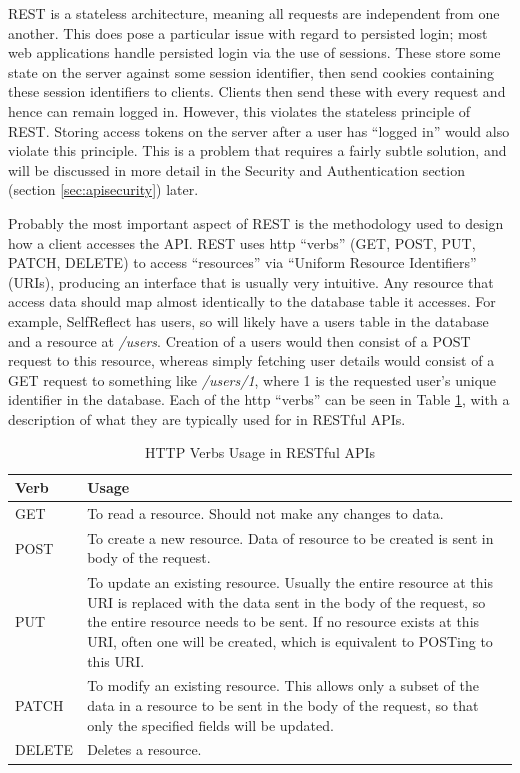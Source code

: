 \documentclass[11pt,openright,a4paper]{report}
\begin{document}
REST is a stateless architecture, meaning all requests are independent from one another. This does pose a particular issue with regard to persisted login; most web applications handle persisted login via the use of sessions. These store some state on the server against some session identifier, then send cookies containing these session identifiers to clients. Clients then send these with every request and hence can remain logged in. However, this violates the stateless principle of REST. Storing access tokens on the server after a user has \enquote{logged in} would also violate this principle. This is a problem that requires a fairly subtle solution, and will be discussed in more detail in the Security and Authentication section (section \ref{sec:apisecurity}) later.

Probably the most important aspect of REST is the methodology used to design how a client accesses the API. REST uses http \enquote{verbs} (GET, POST, PUT, PATCH, DELETE) \parencite{httpmethods} to access \enquote{resources} via \enquote{Uniform Resource Identifiers} (URIs), producing an interface that is usually very intuitive. Any resource that access data should map almost identically to the database table it accesses. For example, SelfReflect has users, so will likely have a users table in the database and a resource at \emph{/users}. Creation of a users would then consist of a POST request to this resource, whereas simply fetching user details would consist of a GET request to something like \emph{/users/1}, where 1 is the requested user's unique identifier in the database. Each of the http \enquote{verbs} can be seen in Table \ref{table:httpverbs}, with a description of what they are typically used for in RESTful APIs.

\begin{table}[ht]
\centering
\caption{HTTP Verbs Usage in RESTful APIs}
\label{table:httpverbs}
\begin{tabular}{|p{2cm}|p{12cm}|}
\hline
\textbf{Verb} & \textbf{Usage} \\ \hline
GET &  To read a resource. Should not make any changes to data.  \\  \hline
POST & To create a new resource. Data of resource to be created is sent in body of the request.\\  \hline
PUT &  To update an existing resource. Usually the entire resource at this URI is replaced with the data sent in the body of the request, so the entire resource needs to be sent. If no resource exists at this URI, often one will be created, which is equivalent to POSTing to this URI.\\  \hline
PATCH & To modify an existing resource. This allows only a subset of the data in a resource to be sent in the body of the request, so that only the specified fields will be updated.\\  \hline
DELETE & Deletes a resource. \\  \hline
\end{tabular}
\end{table}
\end{document}

